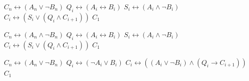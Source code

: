 \begin{algorithm}[H]
    \caption{Lexicographic Comparison of Streams of Boolean Variables \( A \succcurlyeq   B \)}
    \begin{algorithmic}[1]
        \State $C_n \leftrightarrow (A_n \vee \neg B_n)$  
            \State $Q_i \leftrightarrow (A_i \leftrightarrow B_i)$  
            \State $S_i \leftrightarrow (A_i \wedge \neg B_i)$  
            \State $C_i \leftrightarrow (S_i \vee (Q_i \wedge C_{i+1}))$ 
        \EndFor
        \State \Return $C_1$
    \EndFunction
    \end{algorithmic}
    \label{alg:lex-ge}
\end{algorithm}

\begin{algorithm}[H]
    \caption{Lexicographic Comparison of Streams of Boolean Variables \( A \succ  B \)}
    \begin{algorithmic}[1]
        \State $C_n \leftrightarrow (A_n \wedge \neg B_n)$  
            \State $Q_i \leftrightarrow (A_i \leftrightarrow B_i)$  
            \State $S_i \leftrightarrow (A_i \wedge \neg B_i)$  
            \State $C_i \leftrightarrow (S_i \vee (Q_i \wedge C_{i+1}))$ 
        \EndFor
        \State \Return $C_1$
    \EndFunction
    \end{algorithmic}
    \label{alg:lex-gs}
\end{algorithm}

\begin{algorithm}[H]
    \caption{Lexicographic Comparison of Streams of Boolean Variables IMPROVED \( A \succcurlyeq   B \)}
    \begin{algorithmic}[1]
        \State $C_n \leftrightarrow (A_n \vee \neg B_n)$  
            \State $Q_i \leftrightarrow (\neg A_i \vee B_i)$    
            \State $C_i \leftrightarrow ((A_i \vee \neg B_i) \wedge (Q_i \rightarrow C_{i+1}) )$ 
        \EndFor
        \State \Return $C_1$
    \EndFunction
    \end{algorithmic}
    \label{alg:lex-ge-improved}
\end{algorithm}

